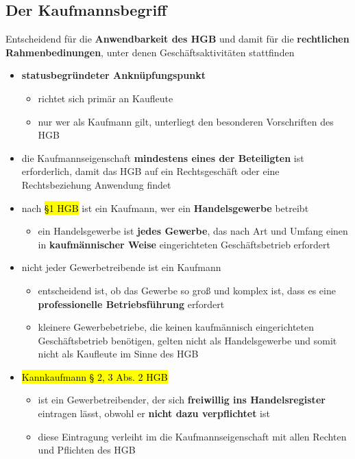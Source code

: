 \documentclass[a4paper, 10pt]{article}
\begin{document}
\subsection{Der Kaufmannsbegriff}
Entscheidend für die \textbf{Anwendbarkeit des HGB} und damit für die \textbf{rechtlichen Rahmenbedinungen}, unter denen Geschäftsaktivitäten stattfinden
\begin{itemize}
    \item \textbf{statusbegründeter Anknüpfungspunkt}
    \begin{itemize}
        \item richtet sich primär an Kaufleute
        \item nur wer als Kaufmann gilt, unterliegt den besonderen Vorschriften des HGB
    \end{itemize}

    \item die Kaufmannseigenschaft \textbf{mindestens eines der Beteiligten} ist erforderlich, damit das HGB auf ein Rechtsgeschäft oder eine Rechtsbeziehung Anwendung findet

    \item nach \hl{§1 HGB} ist ein Kaufmann, wer ein \textbf{Handelsgewerbe} betreibt
    \begin{itemize}
        \item ein Handelsgewerbe ist \textbf{jedes Gewerbe}, das nach Art und Umfang einen in \textbf{kaufmännischer Weise} eingerichteten Geschäftsbetrieb erfordert
    \end{itemize}

    \item nicht jeder Gewerbetreibende ist ein Kaufmann 
    \begin{itemize}
        \item entscheidend ist, ob das Gewerbe so groß und komplex ist, dass es eine \textbf{professionelle Betriebsführung} erfordert
        \item kleinere Gewerbebetriebe, die keinen kaufmännisch eingerichteten Geschäftsbetrieb benötigen, gelten nicht als Handelsgewerbe und somit nicht als Kaufleute im Sinne des HGB
    \end{itemize}

    \item \hl{Kannkaufmann § 2, 3 Abs. 2
HGB}
    \begin{itemize}
        \item ist ein Gewerbetreibender, der sich \textbf{freiwillig ins Handelsregister} eintragen lässt, obwohl er \textbf{nicht dazu verpflichtet} ist
        \item diese Eintragung verleiht im die Kaufmannseigenschaft mit allen Rechten und Pflichten des HGB
    \end{itemize}
\end{itemize}
\end{document}
